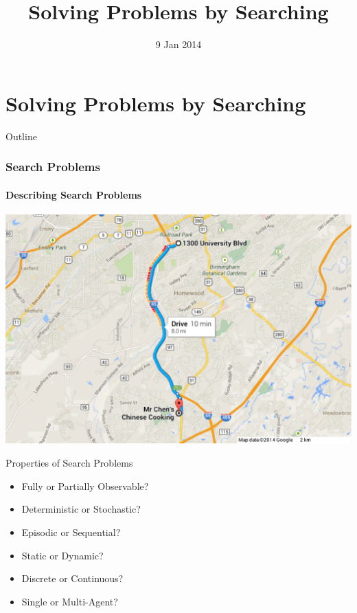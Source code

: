 \documentclass[14pt]{beamer}
\title{Solving Problems by Searching}
\date[]{9 Jan 2014}
\begin{document}
\begin{frame}
  \titlepage
\end{frame}

\part{Solving Problems by Searching}

\begin{frame}{Outline}
\tableofcontents
\end{frame}

\section{Search Problems}

\subsection{Describing Search Problems}
\begin{frame}[plain]
	\begin{center}
		\includegraphics[width=\textwidth]{uab-to-mr-chens.pdf}
	\end{center}
\end{frame}

\begin{frame}{Properties of Search Problems}
	\begin{itemize}
		\item \alert<2->{Fully} or Partially Observable?
		\item \alert<2->{Deterministic} or Stochastic?
		\item Episodic or \alert<2->{Sequential}?
		\item \alert<2->{Static} or Dynamic?
		\item \alert<2->{Discrete} or Continuous?
		\item \alert<2->{Single} or Multi-Agent?
	\end{itemize}
\end{frame}
\end{document}
